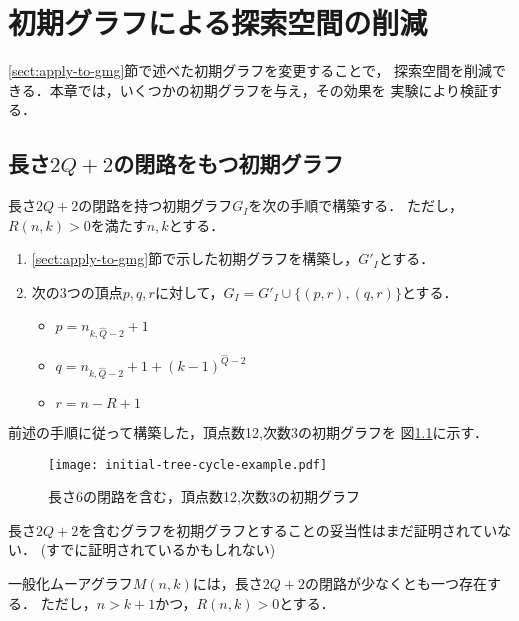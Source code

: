 
\chapter{初期グラフによる探索空間の削減}
\label{chap:reduce-by-initial-graph}
\ref{sect:apply-to-gmg}節で述べた初期グラフを変更することで，
探索空間を削減できる．本章では，いくつかの初期グラフを与え，その効果を
実験により検証する．

\section{長さ$2Q+2$の閉路をもつ初期グラフ}
\label{sect:initial-graph-cycle}
長さ$2Q+2$の閉路を持つ初期グラフ$G_I$を次の手順で構築する．
ただし，$R(n,k)>0$を満たす$n,k$とする．
\begin{enumerate}
\item \ref{sect:apply-to-gmg}節で示した初期グラフを構築し，$G'_I$とする．
\item 次の3つの頂点$p,q,r$に対して，$G_I=G'_I\cup\{(p,r),(q,r)\}$とする．
  \begin{itemize}
  \item $p=n_{k,\hat{Q}-2}+1$
  \item $q=n_{k,\hat{Q}-2}+1+(k-1)^{\hat{Q}-2}$
  \item $r=n-R+1$
  \end{itemize}
\end{enumerate}

\begin{example}
  \label{ex:initial-graph-cycle}
  前述の手順に従って構築した，頂点数12,次数3の初期グラフを
  図\ref{fig:initial-graph-cycle-example}に示す．
  \begin{figure}
    \centering
    \texttt{[image: initial-tree-cycle-example.pdf]}
    \caption{長さ6の閉路を含む，頂点数12,次数3の初期グラフ}
    \label{fig:initial-graph-cycle-example}
  \end{figure}
\end{example}

長さ$2Q+2$を含むグラフを初期グラフとすることの妥当性はまだ証明されていない．
(すでに証明されているかもしれない)
\begin{conjecture}
  一般化ムーアグラフ$M(n,k)$には，長さ$2Q+2$の閉路が少なくとも一つ存在する．
  ただし，$n>k+1$かつ，$R(n,k)>0$とする．
\end{conjecture}

